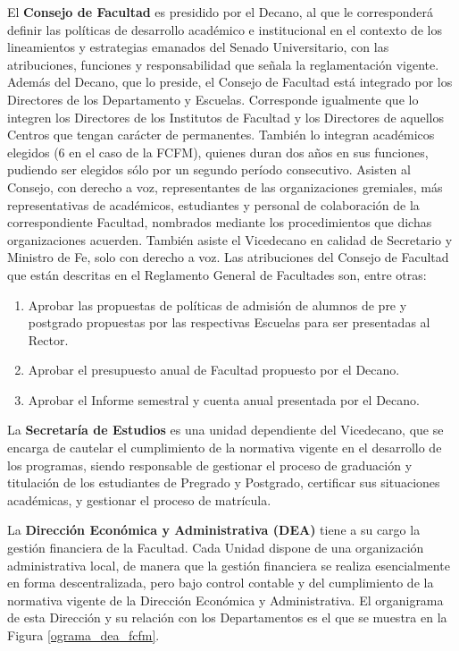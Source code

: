 El \textbf{Consejo de Facultad} es presidido por el Decano, al que le corresponderá definir las
políticas de desarrollo académico e institucional en el contexto de los lineamientos y estrategias
emanados del Senado Universitario, con las atribuciones, funciones y responsabilidad que señala la
reglamentación vigente. Además del Decano, que lo preside, el Consejo de Facultad está integrado
por los Directores de los Departamento y Escuelas. Corresponde igualmente que lo integren los
Directores de los Institutos de Facultad y los Directores de aquellos Centros que tengan carácter de
permanentes. También lo integran académicos elegidos (6 en el caso de la FCFM), quienes duran
dos años en sus funciones, pudiendo ser elegidos sólo por un segundo período consecutivo. Asisten
al Consejo, con derecho a voz, representantes de las organizaciones gremiales, más representativas
de académicos, estudiantes y personal de colaboración de la correspondiente Facultad, nombrados
mediante los procedimientos que dichas organizaciones acuerden. También asiste el Vicedecano
en calidad de Secretario y Ministro de Fe, solo con derecho a voz. Las atribuciones del Consejo de
Facultad que están descritas en el Reglamento General de Facultades son, entre otras:

\begin{enumerate}
\item Aprobar las propuestas de políticas de admisión de alumnos de pre y postgrado propuestas
por las respectivas Escuelas para ser presentadas al Rector.
\item Aprobar el presupuesto anual de Facultad propuesto por el Decano.
\item Aprobar el Informe semestral y cuenta anual presentada por el Decano.
\end{enumerate}

La \textbf{Secretaría de Estudios} es una unidad dependiente del Vicedecano, que se encarga de
cautelar el cumplimiento de la normativa vigente en el desarrollo de los programas, siendo
responsable de gestionar el proceso de graduación y titulación de los estudiantes de Pregrado y
Postgrado, certificar sus situaciones académicas, y gestionar el proceso de matrícula.

La \textbf{Dirección Económica y Administrativa (DEA)} tiene a su cargo la gestión financiera de
la Facultad. Cada Unidad dispone de una organización administrativa local, de manera que la
gestión financiera se realiza esencialmente en forma descentralizada, pero bajo control contable
y del cumplimiento de la normativa vigente de la Dirección Económica y Administrativa. El
organigrama de esta Dirección y su relación con los Departamentos es el que se muestra en la
Figura \ref{ograma_dea_fcfm}.


